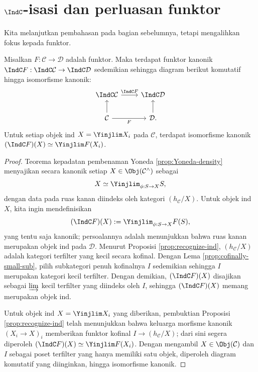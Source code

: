 \section{\texorpdfstring{$\IndC$}{Ind}-isasi dan perluasan funktor}\label{sec:Indization-functor}
Kita melanjutkan pembahasan pada bagian sebelumnya, tetapi mengalihkan fokus kepada funktor.

\begin{definition-proposition}\label{def:Ind-functor}
	Misalkan $F: \mathcal{C} \to \mathcal{D}$ adalah funktor. Maka terdapat funktor kanonik $\IndC F: \IndC\mathcal{C} \to \IndC\mathcal{D}$ sedemikian sehingga diagram berikut komutatif hingga isomorfisme kanonik:
	\[\begin{tikzcd}
		\IndC\mathcal{C} \arrow[r, "{\IndC F}"] & \IndC \mathcal{D} \\
		\mathcal{C} \arrow[u] \arrow[r, "F"'] & \mathcal{D}. \arrow[u]
	\end{tikzcd}\]
	Untuk setiap objek ind $X = \Yinjlim X_i$ pada $\mathcal{C}$, terdapat isomorfisme kanonik $(\IndC F)(X) \simeq \Yinjlim F(X_i)$.
\end{definition-proposition}
\begin{proof}
	Teorema kepadatan pembenaman Yoneda \ref{prop:Yoneda-density} menyajikan secara kanonik setiap $X \in \Obj(\mathcal{C}^\wedge)$ sebagai
	\[ X \simeq \Yinjlim_{\phi: S \to X} S, \]
	dengan data pada ruas kanan diindeks oleh kategori $(h_{\mathcal{C}}/X)$. Untuk objek ind $X$, kita ingin mendefinisikan
	\[ (\IndC F)(X) := \Yinjlim_{\phi: S \to X} F(S), \]
	yang tentu saja kanonik; persoalannya adalah menunjukkan bahwa ruas kanan merupakan objek ind pada $\mathcal{D}$. Menurut Proposisi \ref{prop:recognize-ind}, $(h_{\mathcal{C}}/X)$ adalah kategori terfilter yang kecil secara kofinal. Dengan Lema \ref{prop:cofinally-small-sub}, pilih subkategori penuh kofinalnya $I$ sedemikian sehingga $I$ merupakan kategori kecil terfilter. Dengan demikian, $(\IndC F)(X)$ disajikan sebagai $\varinjlim$ kecil terfilter yang diindeks oleh $I$, sehingga $(\IndC F)(X)$ memang merupakan objek ind.
	
	Untuk objek ind $X = \Yinjlim X_i$ yang diberikan, pembuktian Proposisi \ref{prop:recognize-ind} telah menunjukkan bahwa keluarga morfisme kanonik $(X_i \to X)_i$ memberikan funktor kofinal $I \to (h_{\mathcal{C}}/X)$; dari sini segera diperoleh $(\IndC F)(X) \simeq \Yinjlim F(X_i)$. Dengan mengambil $X \in \Obj(\mathcal{C})$ dan $I$ sebagai poset terfilter yang hanya memiliki satu objek, diperoleh diagram komutatif yang diinginkan, hingga isomorfisme kanonik.
\end{proof}

